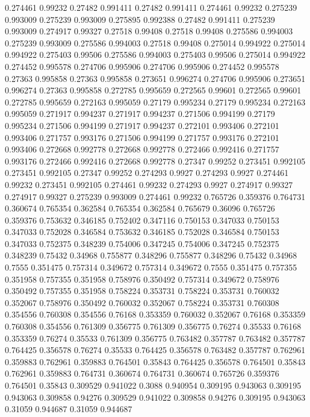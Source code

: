 0.274461 0.99232
0.27482 0.991411
0.27482 0.991411
0.274461 0.99232
0.275239 0.993009
0.275239 0.993009
0.275895 0.992388
0.27482 0.991411
0.275239 0.993009
0.274917 0.99327
0.27518 0.99408
0.27518 0.99408
0.275586 0.994003
0.275239 0.993009
0.275586 0.994003
0.27518 0.99408
0.275014 0.994922
0.275014 0.994922
0.275403 0.99506
0.275586 0.994003
0.275403 0.99506
0.275014 0.994922
0.274452 0.995578
0.274706 0.995906
0.274706 0.995906
0.274452 0.995578
0.27363 0.995858
0.27363 0.995858
0.273651 0.996274
0.274706 0.995906
0.273651 0.996274
0.27363 0.995858
0.272785 0.995659
0.272565 0.99601
0.272565 0.99601
0.272785 0.995659
0.272163 0.995059
0.27179 0.995234
0.27179 0.995234
0.272163 0.995059
0.271917 0.994237
0.271917 0.994237
0.271506 0.994199
0.27179 0.995234
0.271506 0.994199
0.271917 0.994237
0.272101 0.993406
0.272101 0.993406
0.271757 0.993176
0.271506 0.994199
0.271757 0.993176
0.272101 0.993406
0.272668 0.992778
0.272668 0.992778
0.272466 0.992416
0.271757 0.993176
0.272466 0.992416
0.272668 0.992778
0.27347 0.99252
0.273451 0.992105
0.273451 0.992105
0.27347 0.99252
0.274293 0.9927
0.274293 0.9927
0.274461 0.99232
0.273451 0.992105
0.274461 0.99232
0.274293 0.9927
0.274917 0.99327
0.274917 0.99327
0.275239 0.993009
0.274461 0.99232
0.765726 0.359376
0.764731 0.360674
0.765354 0.362584
0.765354 0.362584
0.765679 0.36096
0.765726 0.359376
0.753632 0.346185
0.752402 0.347116
0.750153 0.347033
0.750153 0.347033
0.752028 0.346584
0.753632 0.346185
0.752028 0.346584
0.750153 0.347033
0.752375 0.348239
0.754006 0.347245
0.754006 0.347245
0.752375 0.348239
0.75432 0.34968
0.755877 0.348296
0.755877 0.348296
0.75432 0.34968
0.7555 0.351475
0.757314 0.349672
0.757314 0.349672
0.7555 0.351475
0.757355 0.351958
0.757355 0.351958
0.758976 0.350492
0.757314 0.349672
0.758976 0.350492
0.757355 0.351958
0.758224 0.353731
0.758224 0.353731
0.760032 0.352067
0.758976 0.350492
0.760032 0.352067
0.758224 0.353731
0.760308 0.354556
0.760308 0.354556
0.76168 0.353359
0.760032 0.352067
0.76168 0.353359
0.760308 0.354556
0.761309 0.356775
0.761309 0.356775
0.76274 0.35533
0.76168 0.353359
0.76274 0.35533
0.761309 0.356775
0.763482 0.357787
0.763482 0.357787
0.764425 0.356578
0.76274 0.35533
0.764425 0.356578
0.763482 0.357787
0.762961 0.359883
0.762961 0.359883
0.764501 0.35843
0.764425 0.356578
0.764501 0.35843
0.762961 0.359883
0.764731 0.360674
0.764731 0.360674
0.765726 0.359376
0.764501 0.35843
0.309529 0.941022
0.3088 0.940954
0.309195 0.943063
0.309195 0.943063
0.309858 0.94276
0.309529 0.941022
0.309858 0.94276
0.309195 0.943063
0.31059 0.944687
0.31059 0.944687
